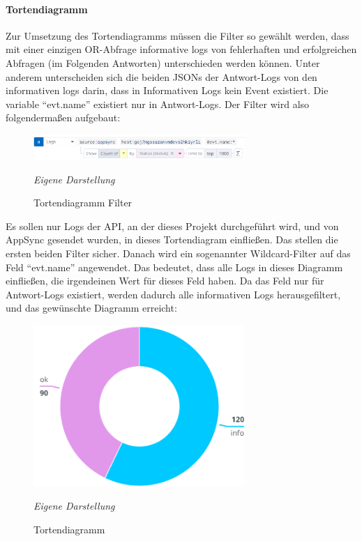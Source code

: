 \paragraph{Tortendiagramm}
Zur Umsetzung des Tortendiagramms müssen die Filter so gewählt werden, dass mit einer einzigen OR-Abfrage informative logs von fehlerhaften und erfolgreichen Abfragen (im Folgenden Antworten) unterschieden werden können. Unter anderem unterscheiden sich die beiden JSONs der Antwort-Logs von den informativen logs darin, dass in Informativen Logs kein Event existiert. Die variable ``evt.name'' existiert nur in Antwort-Logs. Der Filter wird also folgendermaßen aufgebaut: \newline
\begin{figure}[H]
\centering
	\begin{minipage}[t]{.7\textwidth} %
	\caption{Tortendiagramm Filter} %
	
	\includegraphics[width = 8cm,keepaspectratio]{pieChartFilter} \newline
	
	\textit{Eigene Darstellung} %
	\label{fig:pieChartFilter}
	\end{minipage}
	\end{figure}
Es sollen nur Logs der API, an der dieses Projekt durchgeführt wird, und von AppSync gesendet wurden, in dieses Tortendiagram einfließen. Das stellen die ersten beiden Filter sicher. Danach wird ein sogenannter Wildcard-Filter auf das Feld ``evt.name'' angewendet. Das bedeutet, dass alle Logs in dieses Diagramm einfließen, die irgendeinen Wert für dieses Feld haben. Da das Feld nur für Antwort-Logs existiert, werden dadurch alle informativen Logs herausgefiltert, und das gewünschte Diagramm erreicht:\newline

	\begin{figure}[H]
	\centering
	\begin{minipage}[t]{.7\textwidth} %
	\caption{Tortendiagramm} %
	
	\includegraphics[width = 8cm,keepaspectratio]{pieChart} \newline
	
	\textit{Eigene Darstellung} %
	\label{fig:pieChart}
	\end{minipage}
	\end{figure}
